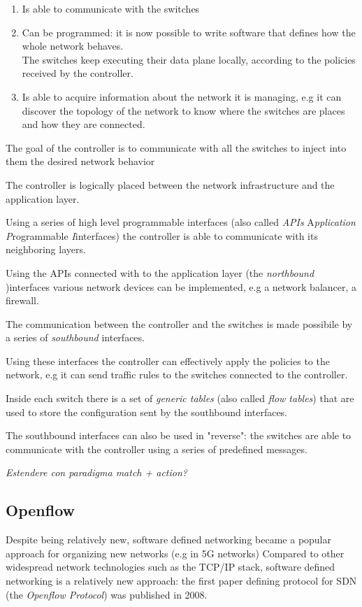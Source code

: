 \documentclass{article}
\begin{document}
	\begin{enumerate}
		\item Is able to communicate with the switches
		\item Can be programmed: it is now possible to write software that defines how the whole network behaves. \\
		The switches keep executing their data plane locally, according to the policies received by the controller.
		\item Is able to acquire information about the network it is managing, e.g it can discover the topology of the network to know where the switches are places and how they are connected.
	\end{enumerate}
	
	The goal of the controller is to communicate with all the switches to inject into them the desired network behavior
	
	The controller is logically placed between the network infrastructure and the application layer.
	
	Using a series of high level programmable interfaces  (also called \textit{APIs} A\textit{pplication} \textit{P}rogrammable \textit{I}interfaces) the controller is able to communicate with its neighboring layers.
	
	
	Using the APIs connected with to the application layer (the \textit{northbound })interfaces various network devices can be implemented, e.g a network balancer, a firewall.
	
	The communication between the controller and the switches is made possibile by a series of \textit{southbound} interfaces.
	
	Using these interfaces the controller can effectively apply the policies to the network, e.g it can send traffic rules to the switches connected to the controller.
	
	Inside each switch there is a set of \textit{generic tables} (also called \textit{flow tables}) that are used to store the configuration sent by the southbound interfaces.
	
	The southbound interfaces can also be used in "reverse": the switches are able to communicate with the controller using a series of predefined messages.
	
	\textit{Estendere con paradigma match + action?}
	
	
	
	\subsection{Openflow}
	Despite being relatively new, software defined networking became a popular approach for organizing new networks (e.g in 5G networks)
	Compared to other widespread network technologies such as the TCP/IP stack, software defined networking is a relatively new approach: the first paper defining protocol for SDN (the \textit{Openflow Protocol}) was published in 2008.
	
\end{document}
